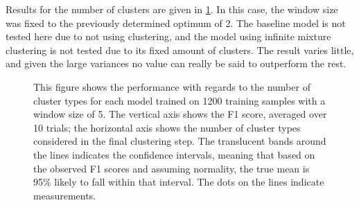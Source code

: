 Results for the number of clusters are given in \cref{fig:numcluster}. In
this case, the window size was fixed to the previously determined optimum of 2.
The baseline model is not tested here due to not using clustering, and the
model using infinite mixture clustering is not tested due to its fixed amount of
clusters. The result varies little, and given the large variances no value can
really be said to outperform the rest.
\begin{figure}[tb]
  \centering
  \caption{This figure shows the performance with regards to the number of
    cluster types for each model trained on 1200 training samples with a window
    size of 5.  The vertical axis shows the F1 score, averaged over 10 trials;
    the horizontal axis shows the number of cluster types considered in the
    final clustering step.  The translucent bands around the lines indicates the
    confidence intervals, meaning that based on the observed F1 scores and
    assuming normality, the true mean is 95\% likely to fall within that interval.
    The dots on the lines indicate measurements.\label{fig:numcluster}}
\end{figure}

